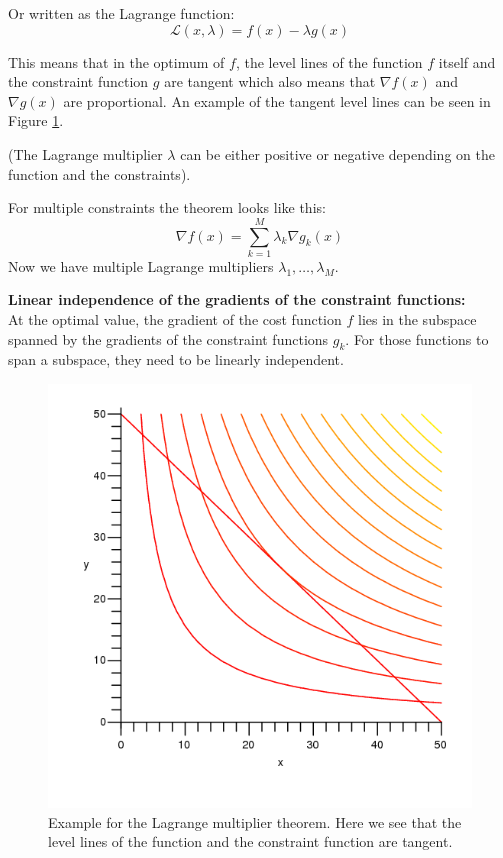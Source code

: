 \documentclass[12pt,a4paper]{article}
\begin{document}
Or written as the Lagrange function:
\begin{equation*}
    \mathcal{L}(x, \lambda) = f(x) - \lambda g(x)
\end{equation*}

This means that in the optimum of $f$, the level lines of the function $f$ itself and the constraint function $g$ are tangent which also means that $\nabla f(x)$ and $\nabla g(x)$ are proportional. An example of the tangent level lines can be seen in Figure \ref{fig:lagrange}.

(The Lagrange multiplier $\lambda$ can be either positive or negative depending on the function and the constraints).

For multiple constraints the theorem looks like this:
\begin{equation*}
    \nabla f(x) = \sum_{k=1}^{M} \lambda_k \nabla g_k (x)
\end{equation*}
Now we have multiple Lagrange multipliers $\lambda_1, \dots , \lambda_M$.

\textbf{Linear independence of the gradients of the constraint functions:}\\
At the optimal value, the gradient of the cost function $f$ lies in the subspace spanned by the gradients of the constraint functions $g_k$. For those functions to span a subspace, they need to be linearly independent.

\begin{figure}
    \centering
    \includegraphics[scale=0.5]{figures/lagrange.png}
    \caption{Example for the Lagrange multiplier theorem. Here we see that the level lines of the function and the constraint function are tangent.}
    \label{fig:lagrange}
\end{figure}

\end{document}
